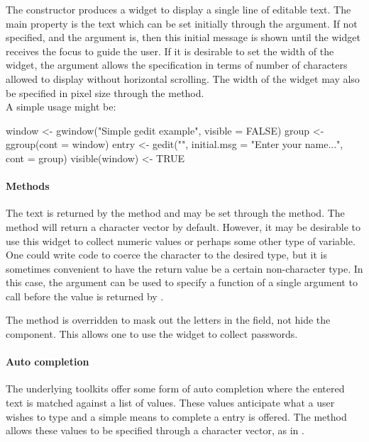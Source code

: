 The  constructor produces a widget to display a
single line of editable text. The main property is the text which can
be set initially through the  argument.  If 
not specified, and the argument  is,
then this initial message is shown until the widget receives the focus
to guide the user.  If it is desirable to set the width of the widget,
the  argument allows the specification in terms
of number of characters allowed to display without horizontal
scrolling. The width of the widget may also be specified in pixel size
through the  method.
\\

A simple usage might be:
\begin{Schunk}
\begin{Sinput}
 window <- gwindow("Simple gedit example", visible = FALSE)
 group <- ggroup(cont = window)
 entry <- gedit("", initial.msg = "Enter your name...", 
                cont = group)
 visible(window) <- TRUE
\end{Sinput}
\end{Schunk}



\paragraph{Methods}
The text is returned by the  method and may be
set through the  method.  The
 method will return a character vector by
default. However, it may be desirable to use this widget to collect
numeric values or perhaps some other type of variable. One could write
code to coerce the character to the desired type, but it is sometimes
convenient to have the return value be a certain non-character
type. In this case, the  argument can be
used to specify a function of a single argument to call before the
value is returned by .

The  method is overridden to mask out the
letters in the field, not hide the component. This allows one to use
the widget to collect passwords.

\paragraph{Auto completion}
The underlying toolkits offer some form of auto completion where the
entered text is matched against a list of values. These values
anticipate what a user wishes to type and a simple means to complete a
entry is offered. The \method{[\ASSIGN}{gedit} method allows these
values to be specified through a character vector, as in .

